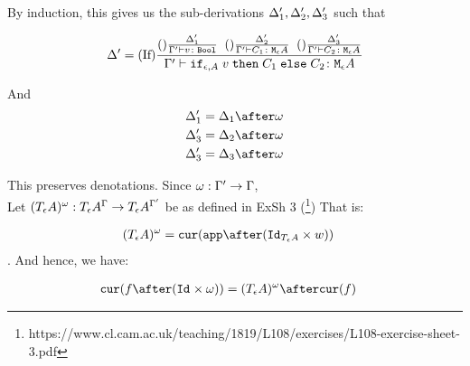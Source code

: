 {    By induction, this gives us the sub-derivations $\Delta_1', \Delta_2', \Delta_3'$ such that

    \begin{equation}
        \Delta' = (\text{If}) \frac{
            (\text{}) \frac{\Delta_1'}{\Gamma' \vdash v \colon \texttt{Bool}}
            \;\;
            (\text{}) \frac{\Delta_2'}{\Gamma' \vdash C_1 \colon \texttt{M}_{\epsilon}{A}}
            \;\;
            (\text{}) \frac{\Delta_3'}{\Gamma' \vdash C_2 \colon \texttt{M}_{\epsilon}{A}}
        }{
            \Gamma' \vdash \texttt{if}_{\epsilon, A}\; v\; \texttt{then}\; C_1 \;\texttt{else} \; C_2 \colon \texttt{M}_{\epsilon}{A}
        }
    \end{equation}

    And 
    \begin{align}
        \D_1' & =\D_1 \after \w\\
        \D_3' & =\D_2 \after \w\\
        \D_3' & =\D_3 \after \w 
    \end{align}


    This preserves denotations.
    Since $\omega: \Gamma' \rightarrow \Gamma$, \\
    Let $(T_{\epsilon}{A})^{\omega}: T_{\epsilon}{A}^{\Gamma}\rightarrow T_{\epsilon}{A}^{\Gamma'}$ be as defined in ExSh 3 (\footnote{https://www.cl.cam.ac.uk/teaching/1819/L108/exercises/L108-exercise-sheet-3.pdf})
    That is:

    \begin{align}
        (\tea)^{\w} & = \cur{\app\after(\Id{\tea}\times w)}
    \end{align}.
    And hence, we have:

    \begin{align}
        \cur{f\after(\Id{}\times \w)} & = (\tea)^{\w} \after\cur{f}
    \end{align}

}
